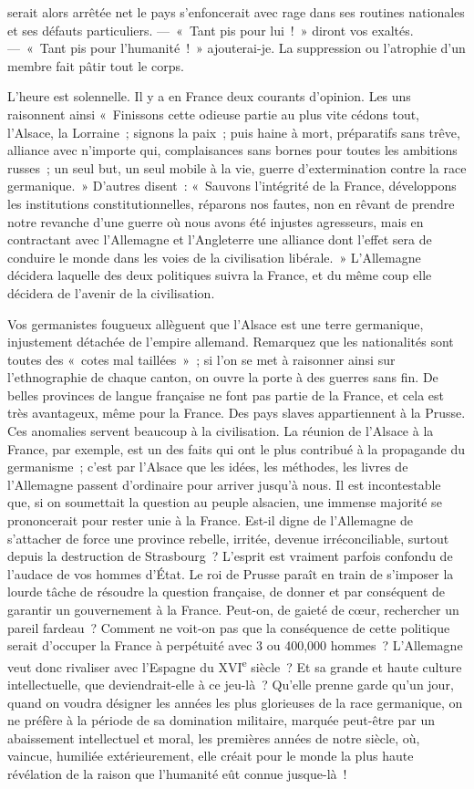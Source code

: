 \documentclass[french,twoside]{book} %
\begin{document}
serait alors arrêtée net le pays s’enfoncerait avec rage dans ses routines nationales et ses défauts particuliers. — « Tant pis pour lui ! » diront vos exaltés. — « Tant pis pour l’humanité ! » ajouterai-je. La suppression ou l’atrophie d’un membre fait pâtir tout le corps.\par
L’heure est solennelle. Il y a en France deux courants d’opinion. Les uns raisonnent ainsi « Finissons cette odieuse partie au plus vite cédons tout, l’Alsace, la Lorraine ; signons la paix ; puis haine à mort, préparatifs sans trêve, alliance avec n’importe qui, complaisances sans bornes pour toutes les ambitions russes ; un seul but, un seul mobile à la vie, guerre d’extermination contre la race germanique. » D’autres disent : « Sauvons l’intégrité de la France, développons les institutions constitutionnelles, réparons nos fautes, non en rêvant de prendre notre revanche d’une guerre où nous avons été injustes agresseurs, mais en contractant avec l’Allemagne et l’Angleterre une alliance dont l’effet sera de conduire le monde dans les voies de la civilisation libérale. » L’Allemagne décidera laquelle des deux politiques suivra la France, et du même coup elle décidera de l’avenir de la civilisation.\par
Vos germanistes fougueux allèguent que l’Alsace est une terre germanique, injustement détachée de l’empire allemand. Remarquez que les nationalités sont toutes des « cotes mal taillées » ; si l’on se met à raisonner ainsi sur l’ethnographie de chaque canton, on ouvre la porte à des guerres sans fin. De belles provinces de langue française ne font pas partie de la France, et cela est très avantageux, même pour la France. Des pays slaves appartiennent à la Prusse. Ces anomalies servent beaucoup à la civilisation. La réunion de l’Alsace à la France, par exemple, est un des faits qui ont le plus contribué à la propagande du germanisme ; c’est par l’Alsace que les idées, les méthodes, les livres de l’Allemagne passent d’ordinaire pour arriver jusqu’à nous. Il est incontestable que, si on soumettait la question au peuple alsacien, une immense majorité se prononcerait pour rester unie à la France. Est-il digne de l’Allemagne de s’attacher de force une province rebelle, irritée, devenue irréconciliable, surtout depuis la destruction de Strasbourg ? L’esprit est vraiment parfois confondu de l’audace de vos hommes d’État. Le roi de Prusse paraît en train de s’imposer la lourde tâche de résoudre la question française, de donner et par conséquent de garantir un gouvernement à la France. Peut-on, de gaieté de cœur, rechercher un pareil fardeau ? Comment ne voit-on pas que la conséquence de cette politique serait d’occuper la France à perpétuité avec 3 ou 400,000 hommes ? L’Allemagne veut donc rivaliser avec l’Espagne du XVI\textsuperscript{e} siècle ? Et sa grande et haute culture intellectuelle, que deviendrait-elle à ce jeu-là ? Qu’elle prenne garde qu’un jour, quand on voudra désigner les années les plus glorieuses de la race germanique, on ne préfère à la période de sa domination militaire, marquée peut-être par un abaissement intellectuel et moral, les premières années de notre siècle, où, vaincue, humiliée extérieurement, elle créait pour le monde la plus haute révélation de la raison que l’humanité eût connue jusque-là !\par
\end{document}
